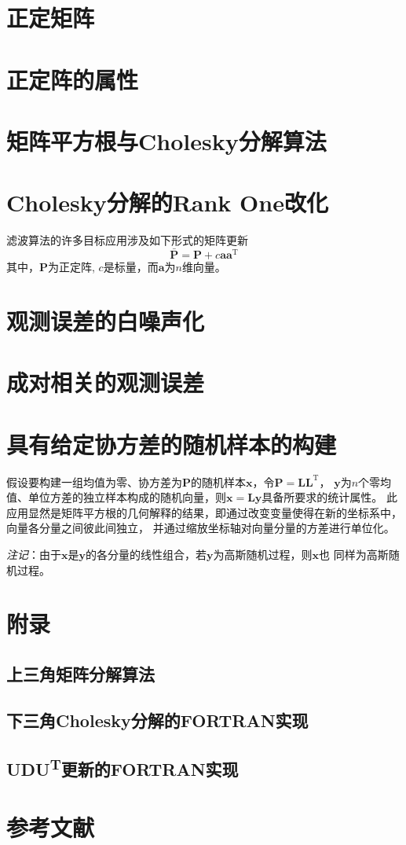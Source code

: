 \documentclass[./book.tex]{subfiles}
\begin{document}
\section{正定矩阵}

\section{正定阵的属性}

\section{矩阵平方根与Cholesky分解算法}

\section{Cholesky分解的Rank One改化}
滤波算法的许多目标应用涉及如下形式的矩阵更新
\begin{equation}
    \bm{\bar{P}} = \bm{P} + c \bm{a} \bm{a}^{\textrm{T}}
\end{equation}
其中，\(\bm{P}\)为正定阵, \(c\)是标量，而\(\bm{a}\)为\(n\)维向量。

\section{观测误差的白噪声化}

\section{成对相关的观测误差}

\section{具有给定协方差的随机样本的构建}
假设要构建一组均值为零、协方差为\(\bm{P}\)的随机样本\(\bm{x}\)，令\(\bm{P}=\bm{L}\bm{L}^{\textrm{T}}\)，
\(\bm{y}\)为\(n\)个零均值、单位方差的独立样本构成的随机向量，则\(\bm{x}=\bm{Ly}\)具备所要求的统计属性。
此应用显然是矩阵平方根的几何解释的结果，即通过改变变量使得在新的坐标系中，向量各分量之间彼此间独立，
并通过缩放坐标轴对向量分量的方差进行单位化。

\emph{注记}：由于\(\bm{x}\)是\(\bm{y}\)的各分量的线性组合，若\(\bm{y}\)为高斯随机过程，则\(\bm{x}\)也
同样为高斯随机过程。

\section{附录}

\subsection{上三角矩阵分解算法}

\subsection{下三角Cholesky分解的FORTRAN实现}

\subsection{\texorpdfstring{UDU\textsuperscript{T}}{UDUT}更新的FORTRAN实现}

\section{参考文献}
\end{document}
